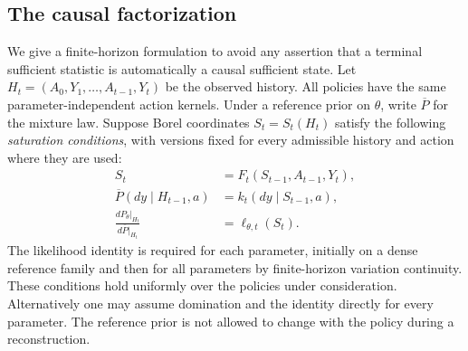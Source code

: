 \subsection{The causal factorization}
We give a finite-horizon formulation to avoid any assertion that a
terminal sufficient statistic is automatically a causal sufficient state.
Let $H_t=(A_0,Y_1,\ldots,A_{t-1},Y_t)$ be the observed history.
All policies have the same parameter-independent action kernels. Under
a reference prior on $\theta$, write $\overline P$ for the mixture law.
Suppose Borel coordinates $S_t=S_t(H_t)$ satisfy the following
\emph{saturation conditions}, with versions fixed for every admissible
history and action where they are used:
\begin{align}
 S_t&=F_t(S_{t-1},A_{t-1},Y_t),                         \label{eq:v8-saturation-update}\\
 \overline P(dy\mid H_{t-1},a)&=k_t(dy\mid S_{t-1},a),  \label{eq:v8-saturation-predict}\\
 \frac{dP_\theta|_{H_t}}{d\overline P|_{H_t}}
     &=\ell_{\theta,t}(S_t).                           \label{eq:v8-saturation-likelihood}
\end{align}
The likelihood identity is required for each parameter, initially on a
dense reference family and then for all parameters by finite-horizon
variation continuity. These conditions hold uniformly over the policies
under consideration. Alternatively one may assume domination and the
identity directly for every parameter. The reference prior is not
allowed to change with the policy during a reconstruction.

